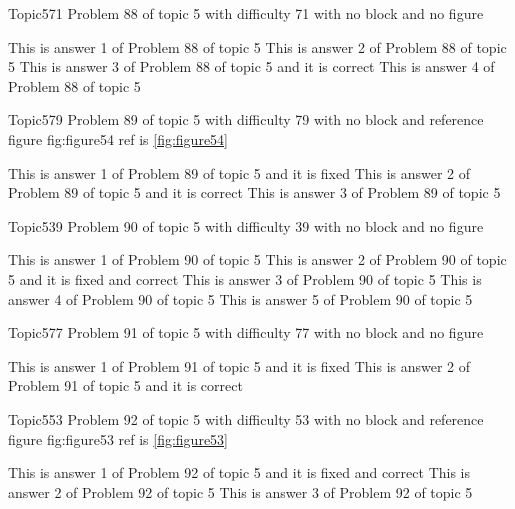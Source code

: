 \documentclass[master]{exam}
\begin{document}
\begin{problem}{Topic5}{71}
	Problem 88 of topic 5 with difficulty 71 with no block and no figure
	\begin{answers}
		\answer This is answer 1 of Problem 88 of topic 5 
		\answer This is answer 2 of Problem 88 of topic 5 
		\answer[correct] This is answer 3 of Problem 88 of topic 5 and it is correct
		\answer This is answer 4 of Problem 88 of topic 5 
	\end{answers}
\end{problem}

\begin{problem}{Topic5}{79}
	Problem 89 of topic 5 with difficulty 79 with no block and reference figure fig:figure54 ref is \ref{fig:figure54}
	\begin{answers}
		\answer[fixed] This is answer 1 of Problem 89 of topic 5 and it is fixed
		\answer[correct] This is answer 2 of Problem 89 of topic 5 and it is correct
		\answer This is answer 3 of Problem 89 of topic 5 
	\end{answers}
\end{problem}

\begin{problem}{Topic5}{39}
	Problem 90 of topic 5 with difficulty 39 with no block and no figure
	\begin{answers}
		\answer This is answer 1 of Problem 90 of topic 5 
		 This is answer 2 of Problem 90 of topic 5 and it is fixed and correct
		\answer This is answer 3 of Problem 90 of topic 5 
		\answer This is answer 4 of Problem 90 of topic 5 
		\answer This is answer 5 of Problem 90 of topic 5 
	\end{answers}
\end{problem}

\begin{problem}{Topic5}{77}
	Problem 91 of topic 5 with difficulty 77 with no block and no figure
	\begin{answers}
		\answer[fixed] This is answer 1 of Problem 91 of topic 5 and it is fixed
		\answer[correct] This is answer 2 of Problem 91 of topic 5 and it is correct
	\end{answers}
\end{problem}

\begin{problem}{Topic5}{53}
	Problem 92 of topic 5 with difficulty 53 with no block and reference figure fig:figure53 ref is \ref{fig:figure53}
	\begin{answers}
		 This is answer 1 of Problem 92 of topic 5 and it is fixed and correct
		\answer This is answer 2 of Problem 92 of topic 5 
		\answer This is answer 3 of Problem 92 of topic 5 
	\end{answers}
\end{problem}
\end{document}

